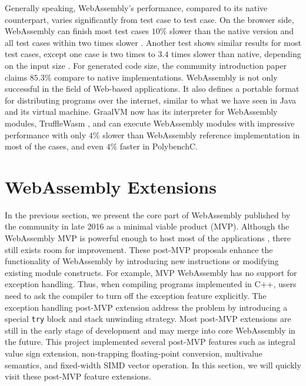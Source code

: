 Generally speaking, WebAssembly's performance, compared to its native
counterpart, varies significantly from test case to test case. On the browser
side, WebAssembly can finish most test cases $10\%$ slower than the native
version and all test cases within two times slower
\cite{10.1145/3062341.3062363}. Another test shows similar results for most
test cases, except one case is two times to $3.4$ times slower than native,
depending on the input size \cite{234914}. For generated code size, the
community introduction paper claims $85.3\%$ compare to native implementations.
WebAssembly is not only successful in the field of Web-based applications. It
also defines a portable format for distributing programs over the internet,
similar to what we have seen in Java and its virtual machine. GraalVM now has
its interpreter for WebAssembly modules, TruffleWasm \cite{trufflewasm}, and can
execute WebAssembly modules with impressive performance with only $4\%$ slower
than WebAssembly reference implementation in most of the cases, and even $4\%$
faster in PolybenchC.

\section{WebAssembly Extensions}

In the previous section, we present the core part of WebAssembly published by
the community in late 2016 as a minimal viable product (MVP). Although the
WebAssembly MVP is powerful enough to host most of the applications
\cite{webassembly-survey}, there still exists room for improvement. These
post-MVP proposals enhance the functionality of WebAssembly by introducing new
instructions or modifying existing module constructs. For example, MVP
WebAssembly has no support for exception handling. Thus, when compiling programs
implemented in C++, users need to ask the compiler to turn off the exception
feature explicitly. The exception handling post-MVP extension address the
problem by introducing a special \texttt{try} block and stack unwinding
strategy. Most post-MVP extensions are still in the early stage of development
and may merge into core WebAssembly in the future. This project implemented
several post-MVP features such as integral value sign extension, non-trapping
floating-point conversion, multivalue semantics, and fixed-width SIMD vector
operation. In this section, we will quickly visit these post-MVP feature
extensions.

